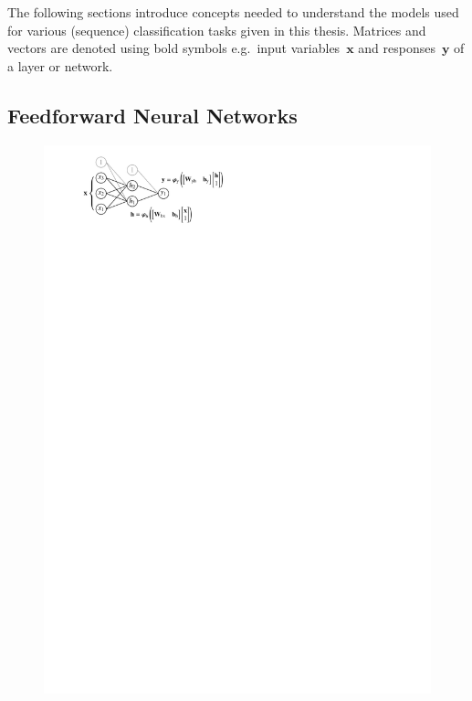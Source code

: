 The following sections introduce concepts needed to understand the models used
for various (sequence) classification tasks given in this thesis. Matrices and
vectors are denoted using bold symbols e.g.\ input variables~$\mathbf{x}$ and
responses~$\mathbf{y}$ of a layer or network.

\subsection{Feedforward Neural Networks}
\label{sec:nn_feedforward}

\begin{figure}[htb]
  \centering
  \begin{minipage}[t]{0.55\textwidth}
    \centering
    \includegraphics{./figures/theory/mlp.pdf}
\end{minipage}
\end{figure}
